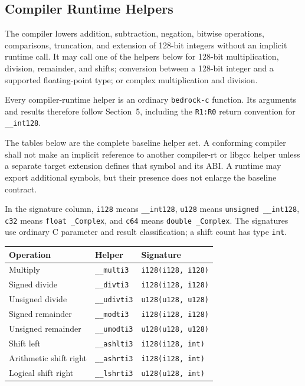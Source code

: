 \documentclass[10pt,twoside]{article}
\begin{document}
\subsection{Compiler Runtime Helpers}
The compiler lowers addition, subtraction, negation, bitwise operations,
comparisons, truncation, and extension of 128-bit integers without an implicit
runtime call. It may call one of the helpers below for 128-bit multiplication,
division, remainder, and shifts; conversion between a 128-bit integer and a
supported floating-point type; or complex multiplication and division.

Every compiler-runtime helper is an ordinary \texttt{bedrock-c} function. Its
arguments and results therefore follow Section~5, including the
\texttt{R1:R0} return convention for \texttt{\_\_int128}.

The tables below are the complete baseline helper set. A conforming compiler shall not make an
implicit reference to another compiler-rt or libgcc helper unless a separate
target extension defines that symbol and its ABI. A runtime may export
additional symbols, but their presence does not enlarge the baseline contract.

In the signature column, \texttt{i128} means \texttt{\_\_int128},
\texttt{u128} means \texttt{unsigned \_\_int128}, \texttt{c32} means
\texttt{float \_Complex}, and \texttt{c64} means
\texttt{double \_Complex}. The signatures use ordinary C parameter and result
classification; a shift count has type \texttt{int}.

\Needspace{2.7in}
\begingroup\footnotesize
\setlength{\tabcolsep}{2pt}
\begin{longtable}{@{}p{1.55in}p{1.55in}p{2.45in}@{}}
\toprule
\textbf{Operation} & \textbf{Helper} & \textbf{Signature}\\
\midrule
\endhead
Multiply & \texttt{\_\allowbreak{}\_\allowbreak{}multi3} & \texttt{i128(i128, i128)}\\
Signed divide & \texttt{\_\allowbreak{}\_\allowbreak{}divti3} & \texttt{i128(i128, i128)}\\
Unsigned divide & \texttt{\_\allowbreak{}\_\allowbreak{}udivti3} & \texttt{u128(u128, u128)}\\
Signed remainder & \texttt{\_\allowbreak{}\_\allowbreak{}modti3} & \texttt{i128(i128, i128)}\\
Unsigned remainder & \texttt{\_\allowbreak{}\_\allowbreak{}umodti3} & \texttt{u128(u128, u128)}\\
Shift left & \texttt{\_\allowbreak{}\_\allowbreak{}ashlti3} & \texttt{i128(i128, int)}\\
Arithmetic shift right & \texttt{\_\allowbreak{}\_\allowbreak{}ashrti3} & \texttt{i128(i128, int)}\\
Logical shift right & \texttt{\_\allowbreak{}\_\allowbreak{}lshrti3} & \texttt{u128(u128, int)}\\
\bottomrule
\end{longtable}
\endgroup
\end{document}
